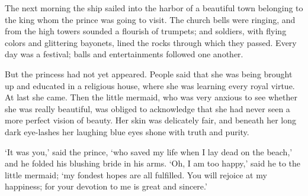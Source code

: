 The next morning the ship sailed into the harbor of a beautiful town belonging to the king whom the prince was going to visit.
The church bells were ringing, and from the high towers sounded a flourish of trumpets; and soldiers, with flying colors and glittering bayonets, lined the rocks through which they passed.
Every day was a festival; balls and entertainments followed one another.

But the princess had not yet appeared.
People said that she was being brought up and educated in a religious house, where she was learning every royal virtue.
At last she came.
Then the little mermaid, who was very anxious to see whether she was really beautiful, was obliged to acknowledge that she had never seen a more perfect vision of beauty.
Her skin was delicately fair, and beneath her long dark eye-lashes her laughing blue eyes shone with truth and purity.

`It was you,' said the prince, `who saved my life when I lay dead on the beach,' and he folded his blushing bride in his arms.
`Oh, I am too happy,' said he to the little mermaid; `my fondest hopes are all fulfilled.
You will rejoice at my happiness; for your devotion to me is great and sincere.'

